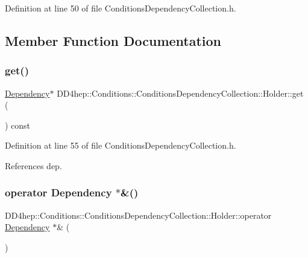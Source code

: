 Definition at line 50 of file Conditions\+Dependency\+Collection.\+h.



\subsection{Member Function Documentation}
\hypertarget{struct_d_d4hep_1_1_conditions_1_1_conditions_dependency_collection_1_1_holder_acbcdfe4c20b27db03737cc51bcfa3a7c}{}\label{struct_d_d4hep_1_1_conditions_1_1_conditions_dependency_collection_1_1_holder_acbcdfe4c20b27db03737cc51bcfa3a7c} 
\subsubsection{\texorpdfstring{get()}{get()}}
{\footnotesize\ttfamily \hyperlink{class_d_d4hep_1_1_conditions_1_1_conditions_dependency_collection_a87252585d3e17ae82813c039b1b47e8a}{Dependency}$\ast$ D\+D4hep\+::\+Conditions\+::\+Conditions\+Dependency\+Collection\+::\+Holder\+::get (\begin{DoxyParamCaption}{ }\end{DoxyParamCaption}) const\hspace{0.3cm}{\ttfamily [inline]}}



Definition at line 55 of file Conditions\+Dependency\+Collection.\+h.



References dep.

\hypertarget{struct_d_d4hep_1_1_conditions_1_1_conditions_dependency_collection_1_1_holder_ae43b3cf1f6220bcea19b735766b017b0}{}\label{struct_d_d4hep_1_1_conditions_1_1_conditions_dependency_collection_1_1_holder_ae43b3cf1f6220bcea19b735766b017b0} 
\subsubsection{\texorpdfstring{operator Dependency $\ast$\&()}{operator Dependency *\&()}}
{\footnotesize\ttfamily D\+D4hep\+::\+Conditions\+::\+Conditions\+Dependency\+Collection\+::\+Holder\+::operator \hyperlink{class_d_d4hep_1_1_conditions_1_1_conditions_dependency_collection_a87252585d3e17ae82813c039b1b47e8a}{Dependency} $\ast$\& (\begin{DoxyParamCaption}{ }\end{DoxyParamCaption})\hspace{0.3cm}{\ttfamily [inline]}}




